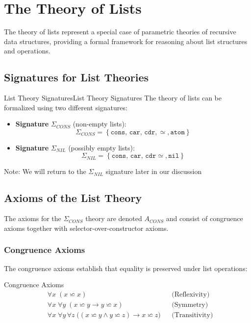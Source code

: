 \documentclass[a4paper]{article}
\newcommand{\eq}{\mathrel{\backsimeq}}
\theoremstyle{definition}
\begin{document}
\section{The Theory of Lists}
The theory of lists represent a special case of parametric theories of recursive data structures, providing a formal 
framework for reasoning about list structures and operations.
\subsection{Signatures for List Theories}
\begin{definition}{List Theory Signatures}{List Theory Signatures}
The theory of lists can be formalized using two different signatures:
\begin{itemize}
	\item \textbf{Signature} \( \Sigma_{CONS} \) (non-empty lists):
	\[
	  \Sigma_{CONS} = \left\{ \texttt{cons, car, cdr}, \simeq, \texttt{atom} \right\}
	\]
	\item \textbf{Signature} \( \Sigma_{NIL} \) (possibly empty lists):
	\[
	  \Sigma_{NIL} = \left\{ \texttt{cons, car, cdr} \simeq, \texttt{nil} \right\}
	\]
\end{itemize}
Note: We will return to the \( \Sigma_{NIL} \) signature later in our discussion
\end{definition}
\subsection{Axioms of the List Theory}
The axioms for the \( \Sigma_{CONS} \) theory are denoted \( A_{CONS} \) and consist of congruence axioms together with selector-over-constructor axioms.
\subsubsection{Congruence Axioms}
The congruence axioms establish that equality is preserved under list operations:
\begin{axbox}{Congruence Axioms}
\begin{align*}
	& \forall x\; (x \eq x) && \text{(Reflexivity)}\\
	& \forall x\; \forall y\; (x \eq y \rightarrow y \eq x) && \text{(Symmetry)}\\
	& \forall x\; \forall y\, \forall z\; \bigl((x \eq y \land y \eq z) \rightarrow x \eq z\bigr) && \text{(Transitivity)}
\end{align*}
\end{axbox}
\end{document}
